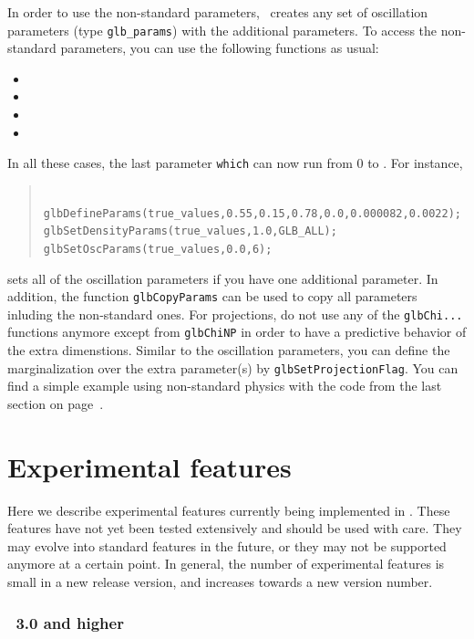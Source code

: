 In order to use the non-standard parameters, \GLOBES\ creates any set of oscillation parameters (type {\tt glb\_params})
with the additional parameters. To access the non-standard parameters, you can use the following functions as usual:
\begin{itemize}
\item
{}
\item
{}
\item
{}
\item
{}
\end{itemize}
In all these cases, the last parameter {\tt which} can now run from $0$ to . For instance,
\begin{quote}
{\tt
 glbDefineParams(true\_values,0.55,0.15,0.78,0.0,0.000082,0.0022); \\
 glbSetDensityParams(true\_values,1.0,GLB\_ALL); \\
 glbSetOscParams(true\_values,0.0,6);
}
\end{quote}
sets all of the oscillation parameters if you have one additional parameter. 
In addition, the function {\tt glbCopyParams}
can be used to copy all parameters inluding the non-standard ones. For projections,
do not use any of the {\tt glbChi...} functions anymore except from {\tt glbChiNP} in order to have a
predictive behavior of the extra dimenstions. Similar to the oscillation parameters, you can define
the marginalization over the extra parameter(s) by {\tt glbSetProjectionFlag}. You can find a simple
example using non-standard physics with the code from the last section on page~\pageref{ex:nsphysics}.



\chapter{Experimental features}
\label{chapt:experimental}

Here we describe experimental features currently being implemented in \GLOBES . These features have not yet been tested extensively and should be used with care. They may evolve into standard features in the future, or they may not be supported anymore at a certain point. In general, the number of experimental features is small in a new release version, and increases towards a new version number.

\subsection*{\GLOBES\ 3.0 and higher}

